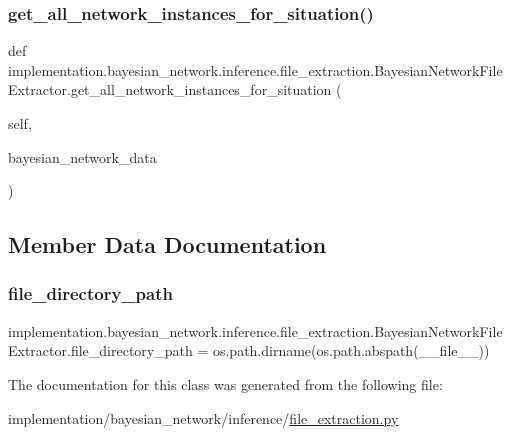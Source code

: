 \subsubsection{\texorpdfstring{get\+\_\+all\+\_\+network\+\_\+instances\+\_\+for\+\_\+situation()}{get\_all\_network\_instances\_for\_situation()}}
{\footnotesize\ttfamily def implementation.\+bayesian\+\_\+network.\+inference.\+file\+\_\+extraction.\+Bayesian\+Network\+File\+Extractor.\+get\+\_\+all\+\_\+network\+\_\+instances\+\_\+for\+\_\+situation (\begin{DoxyParamCaption}\item[{}]{self,  }\item[{}]{bayesian\+\_\+network\+\_\+data }\end{DoxyParamCaption})}



\subsection{Member Data Documentation}
\mbox{\label{classimplementation_1_1bayesian__network_1_1inference_1_1file__extraction_1_1_bayesian_network_file_extractor_accbb2223f0fc75ba78cb2dee69d651f0}} 
\subsubsection{\texorpdfstring{file\+\_\+directory\+\_\+path}{file\_directory\_path}}
{\footnotesize\ttfamily implementation.\+bayesian\+\_\+network.\+inference.\+file\+\_\+extraction.\+Bayesian\+Network\+File\+Extractor.\+file\+\_\+directory\+\_\+path = os.\+path.\+dirname(os.\+path.\+abspath(\+\_\+\+\_\+file\+\_\+\+\_\+))\hspace{0.3cm}{\ttfamily [static]}}



The documentation for this class was generated from the following file\+:\begin{DoxyCompactItemize}
\item 
implementation/bayesian\+\_\+network/inference/\hyperlink{file__extraction_8py}{file\+\_\+extraction.\+py}\end{DoxyCompactItemize}
